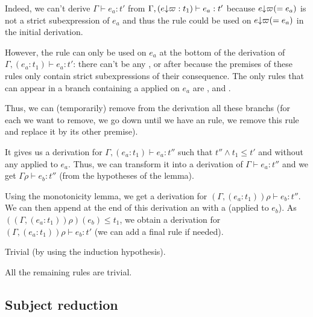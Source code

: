 \documentclass[a4paper]{article}
\theoremstyle{definition}
\begin{document}
\begin{description}
\begin{itemize}
            Indeed, we can't derive $\Gamma \vdash e_a : t'$ from $\Gamma,(e{\downarrow}\varpi:t_1) \vdash e_a : t'$ because $e{\downarrow}\varpi (= e_a)$
            is not a strict subexpression of $e_a$ and thus the rule  could be used on $e{\downarrow}\varpi (= e_a)$ in the initial derivation.

            However, the rule  can only be used on $e_a$ at the bottom of the derivation of $\Gamma,(e_a:t_1) \vdash e_a : t'$:
            there can't be any ,  or  after because the premises of these rules only contain strict subexpressions of their
            consequence. The only rules that can appear in a branch containing a  applied on $e_a$ are ,  and .

            Thus, we can (temporarily) remove from the derivation all these branchs
            (for each  we want to remove, we go down until we have an  rule,
            we remove this  rule and replace it by its other premise).

            It gives us a derivation for $\Gamma,(e_a:t_1) \vdash e_a : t''$ such that $t''\land t_1 \leq t'$ and without any  applied to $e_a$.
            Thus, we can transform it into a derivation of $\Gamma \vdash e_a : t''$ and we get $\Gamma\rho \vdash e_b : t''$ (from the hypotheses of the lemma).

            Using the monotonicity lemma, we get a derivation for $(\Gamma,(e_a:t_1))\rho\vdash e_b : t''$.
            We can then append at the end of this derivation an  with a  (applied to $e_b$).
            As $((\Gamma,(e_a:t_1))\rho)(e_b) \leq t_1$, we obtain a derivation
            for $(\Gamma,(e_a:t_1))\rho\vdash e_b : t'$ (we can add a final  rule if needed).
            
          \end{itemize}

          \item[\Rule{PTypeof}] Trivial (by using the induction hypothesis).
          \item[\Rule{P$\cdots$}] All the remaining rules are trivial.
        \end{description}

        \subsection{Subject reduction}
\end{document}
